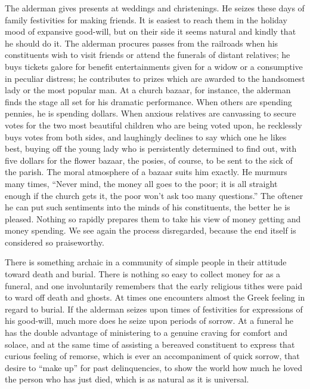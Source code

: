 \documentclass[]{article}
\begin{document}
\begin{sectionbody}
\addamsparagraph The alderman gives presents at weddings and christenings. He seizes
these days of family festivities for making friends. It is easiest to
reach them in the holiday mood of expansive good-will, but on their side
it seems natural and kindly that he should do it. The alderman procures
passes from the railroads when his constituents wish to visit friends or
attend the funerals of distant relatives; he buys tickets galore for
benefit entertainments given for a widow or a consumptive in peculiar
distress; he contributes to prizes which are awarded to the handsomest
lady or the most popular man. At a church bazaar, for instance, the
alderman finds the stage all set for his dramatic performance. When
others are spending pennies, he is spending dollars. When anxious
relatives are canvassing to secure votes for the two most beautiful
children who are being voted upon, he recklessly buys votes from both
sides, and laughingly declines to say which one he likes best, buying
off the young lady who is persistently determined to find out, with five
dollars for the flower bazaar, the posies, of course, to be sent to the
sick of the parish. The moral atmosphere of a bazaar suits him exactly.
He murmurs many times, ``Never mind, the money all goes to the poor; it
is all straight enough if the church gets it, the poor won't ask too
many questions.'' The oftener he can put such sentiments into the minds
of his constituents, the better he is pleased. Nothing so rapidly
prepares them to take his view of money getting and money spending. We
see again the process disregarded, because the end itself is considered
so praiseworthy.

\addamsparagraph There is something archaic in a community of simple people in their
attitude toward death and burial. There is nothing so easy to collect
money for as a funeral, and one involuntarily remembers that the early
religious tithes were paid to ward off death and ghosts. At times one
encounters almost the Greek feeling in regard to burial. If the alderman
seizes upon times of festivities for expressions of his good-will, much
more does he seize upon periods of sorrow. At a funeral he has the
double advantage of ministering to a genuine craving for comfort and
solace, and at the same time of assisting a bereaved constituent to
express that curious feeling of remorse, which is ever an accompaniment
of quick sorrow, that desire to ``make up'' for past delinquencies, to
show the world how much he loved the person who has just died, which is
as natural as it is universal.


\end{sectionbody}
\end{document}
